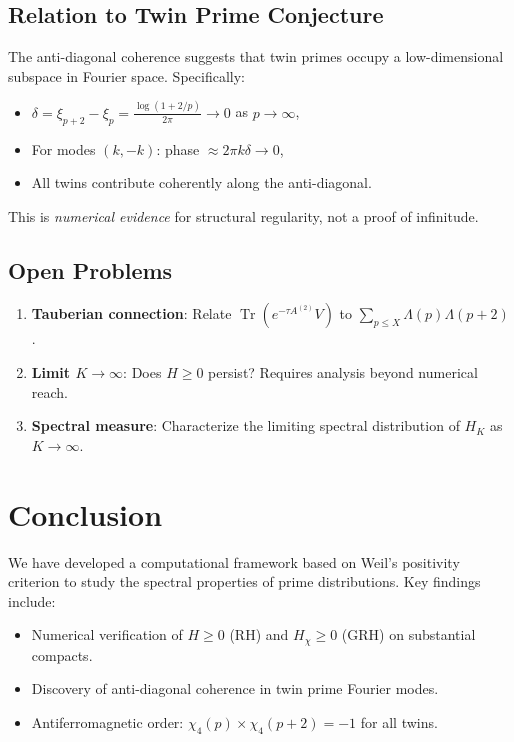 \documentclass[11pt,a4paper]{article}
\theoremstyle{definition}
\newcommand{\Tr}{\operatorname{Tr}}
\begin{document}
\subsection{Relation to Twin Prime Conjecture}

The anti-diagonal coherence suggests that twin primes occupy a low-dimensional subspace in Fourier space. Specifically:
\begin{itemize}
    \item $\delta = \xi_{p+2} - \xi_p = \frac{\log(1+2/p)}{2\pi} \to 0$ as $p \to \infty$,
    \item For modes $(k, -k)$: phase $\approx 2\pi k \delta \to 0$,
    \item All twins contribute coherently along the anti-diagonal.
\end{itemize}

This is \emph{numerical evidence} for structural regularity, not a proof of infinitude.

\subsection{Open Problems}

\begin{enumerate}
    \item \textbf{Tauberian connection}: Relate $\Tr(e^{-\tau A^{(2)}} V)$ to $\sum_{p \leq X} \Lambda(p)\Lambda(p+2)$.
    \item \textbf{Limit $K \to \infty$}: Does $H \geq 0$ persist? Requires analysis beyond numerical reach.
    \item \textbf{Spectral measure}: Characterize the limiting spectral distribution of $H_K$ as $K \to \infty$.
\end{enumerate}

\section{Conclusion}

We have developed a computational framework based on Weil's positivity criterion to study the spectral properties of prime distributions. Key findings include:

\begin{itemize}
    \item Numerical verification of $H \geq 0$ (RH) and $H_\chi \geq 0$ (GRH) on substantial compacts.
    \item Discovery of anti-diagonal coherence in twin prime Fourier modes.
    \item Antiferromagnetic order: $\chi_4(p) \times \chi_4(p+2) = -1$ for all twins.
\end{itemize}
\end{document}
